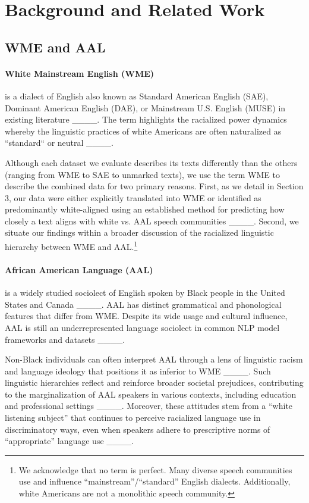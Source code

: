 \section{Background and Related Work}
\subsection{WME and AAL}
\paragraph{White Mainstream English (WME)} is a dialect of English also known as Standard American English (SAE), Dominant American English (DAE), or Mainstream U.S. English (MUSE) in existing literature ____. The term highlights the racialized power dynamics whereby the linguistic practices of white Americans are often naturalized as ``standard`` or neutral ____.

Although each dataset we evaluate describes its texts differently than the others (ranging from WME to SAE to unmarked texts), we use the term WME to describe the combined data for two primary reasons. First, as we detail in Section 3, our data were either explicitly translated into WME or identified as predominantly white-aligned using an established method for predicting how closely a text aligns with white vs. AAL speech communities ____. Second, we situate our findings within a broader discussion of the racialized linguistic hierarchy between WME and AAL.\footnote{We acknowledge that no term is perfect. Many diverse speech communities use and influence ``mainstream''/``standard'' English dialects. Additionally, white Americans are not a monolithic speech community.}

\paragraph{African American Language (AAL)} is a widely studied sociolect of English spoken by Black people in the United States and Canada ____. AAL has distinct grammatical and phonological features that differ from WME. Despite its wide usage and cultural influence, AAL is still an underrepresented language sociolect in common NLP model frameworks and datasets ____. 

Non-Black individuals can often interpret AAL through a lens of linguistic racism and language ideology that positions it as inferior to WME ____. Such linguistic hierarchies reflect and reinforce broader societal prejudices, contributing to the marginalization of AAL speakers in various contexts, including education and professional settings ____. Moreover, these attitudes stem from a ``white listening subject'' that continues to perceive racialized language use in discriminatory ways, even when speakers adhere to prescriptive norms of ``appropriate'' language use ____.


